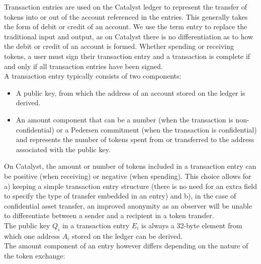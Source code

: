 Transaction entries are used on the Catalyst ledger to represent the transfer of tokens into or out of the account referenced in the entries. This generally takes the form of debit or credit of an account. We use the term entry to replace the traditional input and output, as on Catalyst there is no differentiation as to how the debit or credit of an account is formed. Whether spending or receiving tokens, a user must sign their transaction entry and a transaction is complete if and only if all transaction entries have been signed.\\

 A transaction entry typically consists of two components: 
 \begin{itemize}
\item A public key, from which the address of an account stored on the ledger is derived.
\item An amount component that can be a number (when the transaction is non-confidential) or a Pedersen commitment (when the transaction is confidential) and represents the number of tokens spent from or transferred to the address associated with the public key.
\end{itemize}
On Catalyst, the amount or number of tokens included in a transaction entry can be positive (when receiving) or negative (when spending). This choice allows for a) keeping a simple transaction entry structure (there is no need for an extra field to specify the type of transfer embedded in an entry) and b), in the case of confidential asset transfer, an improved anonymity as an observer will be unable to differentiate between a sender and a recipient in a token transfer. \\

The public key $Q_i$ in a transaction entry $E_i$ is always a 32-byte element from which one address $A_i$ stored on the ledger can be derived. \\

The amount component of an entry however differs depending on the nature of the token exchange:

